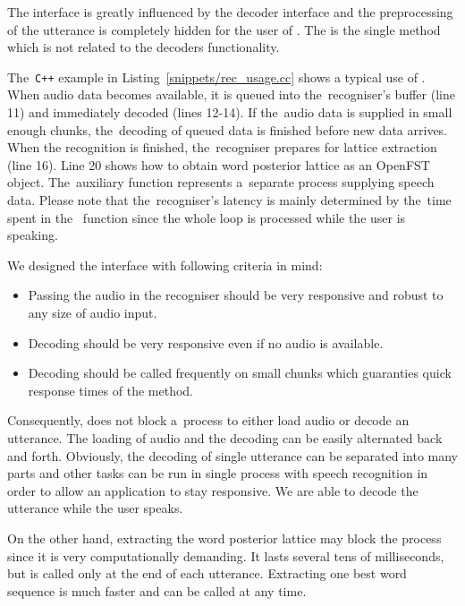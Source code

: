 The interface is greatly influenced by the decoder interface and the preprocessing of the utterance is completely hidden for the user of .
The  is the single method which is not related to the decoders functionality. 

The~\verb!C++! example in Listing~\ref{snippets/rec_usage.cc} shows a typical use of .
When audio data becomes available, it is queued into the~recogniser's buffer (line 11) and immediately decoded (lines 12-14).
If the~audio data is supplied in small enough chunks, the~decoding of queued data is finished before new data arrives.
When the recognition is finished, the~recogniser prepares for lattice extraction (line 16).
Line 20 shows how to obtain word posterior lattice as an OpenFST object.
The~auxiliary  function represents a~separate process supplying speech data.
Please note that the~recogniser's latency is mainly determined by the~time spent in the~ function since the whole loop is processed while the user is speaking.


We designed the interface with following criteria in mind:
\begin{itemize}
    \item Passing the audio in the recogniser should be very responsive and robust to any size of audio input.
    \item Decoding should be very responsive even if no audio is available.
    \item Decoding should be called frequently on small chunks which guaranties quick response times of the  method.
\end{itemize}

Consequently,  does not block a~process to either load audio or decode an utterance.
The loading of audio and the decoding can be easily alternated back and forth.
Obviously, the decoding of single utterance can be separated into many parts and other tasks can be run in single process with speech recognition in order to allow an application to stay responsive.
We are able to decode the utterance while the user speaks.

On the other hand, extracting the word posterior lattice may block the process since it is very computationally demanding.
It lasts several tens of milliseconds, but is called only at the end of each utterance.
Extracting one best word sequence is much faster and can be called at any time.

